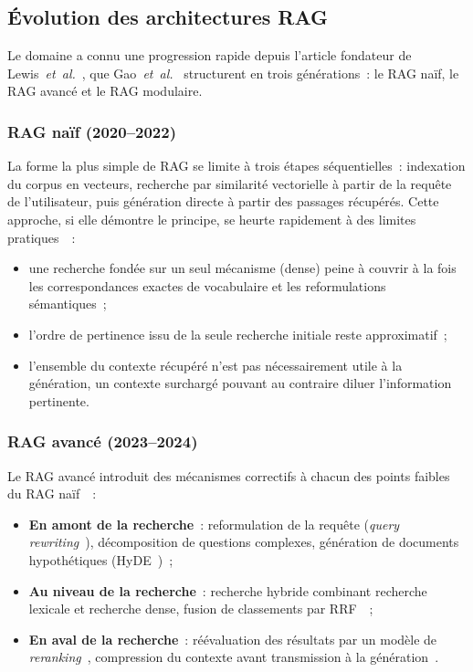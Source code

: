 \documentclass[11pt,a4paper]{article}
\begin{document}
\subsection{Évolution des architectures RAG}
\label{sec:evolution-rag}

Le domaine a connu une progression rapide depuis l'article fondateur de Lewis~\textit{et~al.}~\cite{lewis2020rag}, que Gao~\textit{et~al.}~\cite{gao2024ragsurvey} structurent en trois générations~: le RAG naïf, le RAG avancé et le RAG modulaire.

\subsubsection{RAG naïf (2020--2022)}

La forme la plus simple de RAG se limite à trois étapes séquentielles~: indexation du corpus en vecteurs, recherche par similarité vectorielle à partir de la requête de l'utilisateur, puis génération directe à partir des passages récupérés. Cette approche, si elle démontre le principe, se heurte rapidement à des limites pratiques~\cite{gao2024ragsurvey}~:
\begin{itemize}
  \item une recherche fondée sur un seul mécanisme (dense) peine à couvrir à la fois les correspondances exactes de vocabulaire et les reformulations sémantiques~;
  \item l'ordre de pertinence issu de la seule recherche initiale reste approximatif~;
  \item l'ensemble du contexte récupéré n'est pas nécessairement utile à la génération, un contexte surchargé pouvant au contraire diluer l'information pertinente.
\end{itemize}

\subsubsection{RAG avancé (2023--2024)}

Le RAG avancé introduit des mécanismes correctifs à chacun des points faibles du RAG naïf~\cite{gao2024ragsurvey,wang2024bestpractices}~:
\begin{itemize}
  \item \textbf{En amont de la recherche}~: reformulation de la requête (\textit{query rewriting}~\cite{ma2023queryrewriting}), décomposition de questions complexes, génération de documents hypothétiques (HyDE~\cite{gao2022hyde})~;
  \item \textbf{Au niveau de la recherche}~: recherche hybride combinant recherche lexicale et recherche dense, fusion de classements par RRF~\cite{cormack2009rrf}~;
  \item \textbf{En aval de la recherche}~: réévaluation des résultats par un modèle de \textit{reranking}~\cite{nogueira2019bert}, compression du contexte avant transmission à la génération~\cite{jiang2023llmlingua,xu2024recomp}.
\end{itemize}
\end{document}
